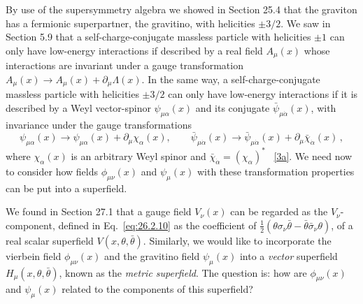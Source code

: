 By use of the supersymmetry algebra we showed in Section 25.4 that the
graviton has a fermionic superpartner, the gravitino, with helicities
\(\pm3/2\). We saw in Section 5.9 that a self-charge-conjugate massless
particle with helicities \(\pm1\) can only have low-energy interactions if
described by a real field \(A_\mu(x)\) whose interactions are invariant under
a gauge transformation
\(A_\mu(x)\to A_\mu(x)+\partial_\mu\Lambda(x)\). In the same way, a
self-charge-conjugate massless particle with helicities \(\pm3/2\) can only
have low-energy interactions if it is described by a Weyl vector-spinor
\(\psi_{\mu\alpha}(x)\) and its conjugate
\(\bar\psi_{\mu\dot\alpha}(x)\), with invariance under the gauge
transformations
\begin{equation}
  \psi_{\mu\alpha}(x)\to
  \psi_{\mu\alpha}(x)+\partial_\mu\chi_\alpha(x),
  \qquad
  \bar\psi_{\mu\dot\alpha}(x)\to
  \bar\psi_{\mu\dot\alpha}(x)
  +\partial_\mu\bar\chi_{\dot\alpha}(x)\,,
  \tag{31.1.13}\label{eq:31.1.13}
\end{equation}
where \(\chi_\alpha(x)\) is an arbitrary Weyl spinor and
\(\bar\chi_{\dot\alpha}=(\chi_\alpha)^*\)
~\hyperref[ch31-ref-3a]{[3a]}. We need now to consider how fields
\(\phi_{\mu\nu}(x)\) and \(\psi_\mu(x)\) with these transformation properties
can be put into a superfield.

We found in Section 27.1 that a gauge field \(V_\nu(x)\) can be regarded as
the \(V_\nu\)-component, defined in Eq.~\eqref{eq:26.2.10} as the coefficient
of
\(\frac12(\theta\sigma_\nu\bar\theta
-\bar\theta\bar\sigma_\nu\theta)\), of a real scalar superfield
\(V(x,\theta,\bar\theta)\). Similarly, we would like to incorporate the vierbein field
\(\phi_{\mu\nu}(x)\) and the gravitino field \(\psi_\mu(x)\) into a
\emph{vector} superfield \(H_\mu(x,\theta,\bar\theta)\), known as the \emph{metric
superfield}. The question is: how are \(\phi_{\mu\nu}(x)\) and
\(\psi_\mu(x)\) related to the components of this superfield?

